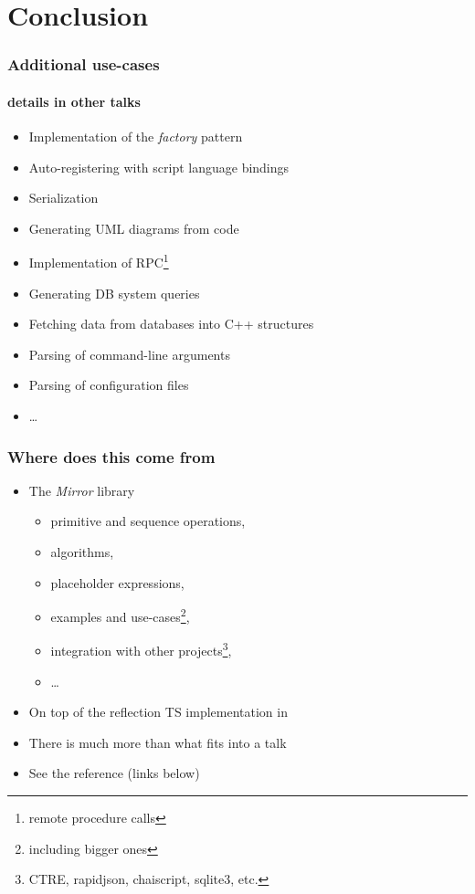 \documentclass[compress,table,xcolor=table]{beamer}
\begin{document}
\section{Conclusion}
\begin{frame}
  \frametitle{Additional use-cases}
  \framesubtitle{details in other talks}
  \begin{itemize}
    \item Implementation of the {\em factory} pattern
    \item Auto-registering with script language bindings
    \item Serialization
    \item Generating UML diagrams from code
    \item Implementation of RPC\footnote{remote procedure calls}
    \item Generating DB system queries
    \item Fetching data from databases into C++ structures
    \item Parsing of command-line arguments
    \item Parsing of configuration files
    \item \ldots
  \end{itemize}
\end{frame}
\begin{frame}
  \frametitle{Where does this come from}
  \larger
  \begin{itemize}
    \item The {\em Mirror} library
    \begin{itemize}
      \item primitive and sequence operations,
      \item algorithms,
      \item placeholder expressions,
      \item examples and use-cases\footnote{including bigger ones},
      \item integration with other projects\footnote{CTRE, rapidjson, chaiscript,
        sqlite3, etc.},
      \item \ldots
    \end{itemize}
    \item On top of the reflection TS implementation in 
    \item There is much more than what fits into a talk
    \item See the reference (links below)
  \end{itemize}
\end{frame}
\end{document}
